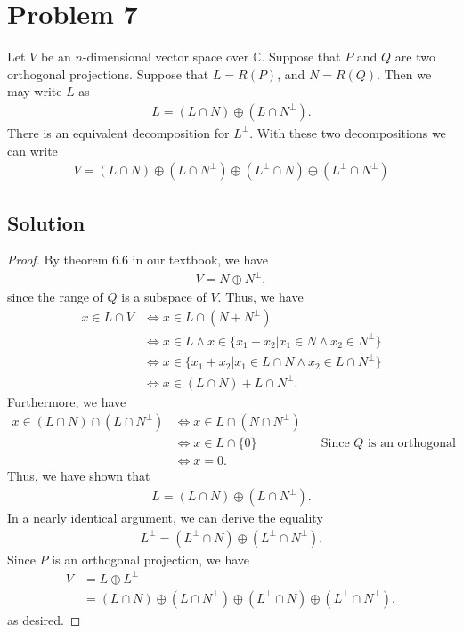 \documentclass[10pt,a4paper]{article}
\theoremstyle{definition}
\begin{document}
\section*{Problem 7} Let $V$ be an $n$-dimensional vector space over $\mathbb{C}$. Suppose that $P$ and $Q$ are two orthogonal projections. Suppose that $L = R(P)$, and $N = R(Q)$. Then we may write $L$ as
\begin{align*}
L = (L \cap N) \oplus (L \cap N^\perp).
\end{align*}
There is an equivalent decomposition for $L^\perp$. With these two decompositions we can write 
\begin{align*}
V = (L \cap N) \oplus (L \cap N^\perp) \oplus (L^\perp \cap N) \oplus (L^\perp \cap N^\perp)
\end{align*}

\subsection*{Solution}
\begin{proof}
By theorem 6.6 in our textbook, we have 
\begin{align*}
V = N \oplus N^\perp,
\end{align*}
since the range of $Q$ is a subspace of $V$. Thus, we have 
\begin{align*}
x \in L \cap V &\iff x \in L \cap (N + N^\perp)\\
&\iff x \in L \land x \in \{x_1 + x_2 | x_1 \in N \land x_2 \in N^\perp \}\\
&\iff x \in \{x_1 + x_2 | x_1 \in L \cap N \land x_2 \in L \cap N^\perp \}\\
&\iff x \in  (L \cap N) + L \cap N^\perp.
\end{align*}
Furthermore, we have
\begin{align*}
x \in  (L \cap N) \cap  (L \cap N^\perp) &\iff x \in L \cap (N \cap N^\perp)\\
&\iff x \in L \cap \{0 \}  && \text{Since } Q \text{ is an orthogonal projection}\\
&\iff x = 0.
\end{align*}
Thus, we have shown that 
\begin{align*}
L = (L \cap N) \oplus (L \cap N^\perp).
\end{align*}
In a nearly identical argument, we can derive the equality
\begin{align*}
L^\perp =  (L^\perp \cap N) \oplus (L^\perp \cap N^\perp).
\end{align*}
Since $P$ is an orthogonal projection, we have
\begin{align*}
V &= L \oplus L^\perp\\
&= (L \cap N) \oplus (L \cap N^\perp) \oplus (L^\perp \cap N) \oplus (L^\perp \cap N^\perp),
\end{align*}
as desired.
\end{proof}
\end{document}
